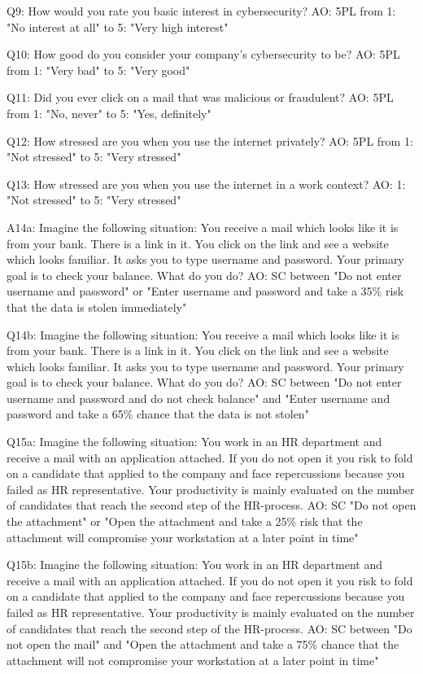 Q9: How would you rate you basic interest in cybersecurity? AO: 5PL from 1: "No interest at all" to 5: "Very high interest"

Q10: How good do you consider your company's cybersecurity to be? AO: 5PL from 1: "Very bad" to 5: "Very good"

Q11: Did you ever click on a mail that was malicious or fraudulent? AO: 5PL from 1: "No, never" to 5: "Yes, definitely"

Q12: How stressed are you when you use the internet privately? AO: 5PL from 1: "Not stressed" to 5: "Very stressed"

Q13: How stressed are you when you use the internet in a work context? AO: 1: "Not stressed" to 5: "Very stressed"

A14a: Imagine the following situation: You receive a mail which looks like it is from your bank. There is a link in it. You click on the link and see a website which looks familiar. It asks you to type username and password. Your primary goal is to check your balance. What do you do? AO: SC between "Do not enter username and password" or "Enter username and password and take a 35\% risk that the data is stolen immediately"

Q14b: Imagine the following situation: You receive a mail which looks like it is from your bank. There is a link in it. You click on the link and see a website which looks familiar. It asks you to type username and password. Your primary goal is to check your balance. What do you do? AO: SC between "Do not enter username and password and do not check balance" and "Enter username and password and take a 65\% chance that the data is not stolen"

Q15a: Imagine the following situation: You work in an HR department and receive a mail with an application attached. If you do not open it you risk to fold on a candidate that applied to the company and face repercussions because you failed as HR representative. Your productivity is mainly evaluated on the number of candidates that reach the second step of the HR-process. AO: SC "Do not open the attachment" or "Open the attachment and take a 25\% risk that the attachment will compromise your workstation at a later point in time"

Q15b: Imagine the following situation: You work in an HR department and receive a mail with an application attached. If you do not open it you risk to fold on a candidate that applied to the company and face repercussions because you failed as HR representative. Your productivity is mainly evaluated on the number of candidates that reach the second step of the HR-process. AO: SC between "Do not open the mail" and "Open the attachment and take a 75\% chance that the attachment will not compromise your workstation at a later point in time"

